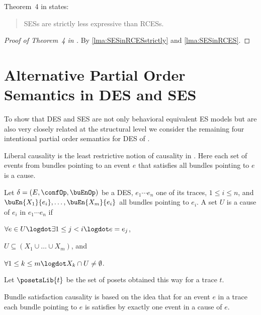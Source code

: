 \documentclass[runningheads,a4paper]{llncs}
\begin{document}
Theorem~4 in \cite{dynamicCausality15} states:
\begin{quote}
	SESs are strictly less expressive than RCESs.
\end{quote}

\begin{proof}[Proof of Theorem~4 in \cite{dynamicCausality15}]
	By \lems\ref{lma:SESinRCESstrictly} and \ref{lma:SESinRCES}.
\end{proof}

\section{Alternative Partial Order Semantics in DES and SES}
\label{app:partialOrderSemantics}

To show that DES and SES are not only behavioral equivalent ES models but are also very closely related at the structural level we consider the remaining four intentional partial order semantics for DES of \cite{Langerak97causalambiguity}.

Liberal causality is the least restrictive notion of causality in \cite{Langerak97causalambiguity}. Here each set of events from bundles pointing to an event $ e $ that satisfies all bundles pointing to $ e $ is a cause.

\begin{definition}
	Let $ \delta = \left( E, \confOp, \buEnOp \right) $ be a DES, $ e_1 \cdots e_n $ one of its traces, $ 1 \leq i \leq n $, and $ \buEn{X_1}{e_i}, \ldots, \buEn{X_m}{e_i} $ all bundles pointing to $ e_i $.
	A set $ U $ is a cause of $ e_i $ in $ e_1 \cdots e_n $ if
	\begin{compactitem}
		\item $ \forall e \in U \logdot \exists 1 \leq j < i \logdot e = e_j $,
		\item $ U \subseteq \left( X_1 \cup \ldots \cup X_m \right) $, and
		\item $ \forall 1 \leq k \leq m \logdot X_k \cap U \neq \emptyset $.
	\end{compactitem}
	Let $ \posetsLib{t} $ be the set of posets obtained this way for a trace $ t $.
\end{definition}

Bundle satisfaction causality is based on the idea that for an event $ e $ in a trace each bundle pointing to $ e $ is satisfies by exactly one event in a cause of $ e $.
\end{document}
